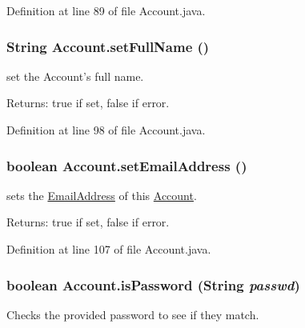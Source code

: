 Definition at line 89 of file Account.java.\hypertarget{classAccount_b24ee6fdfa6029cba65b217050933c89}{
\subsubsection{\setlength{\rightskip}{0pt plus 5cm}String Account.setFullName ()}}
\label{classAccount_b24ee6fdfa6029cba65b217050933c89}


set the Account's full name. 

\begin{Desc}
\item[Returns:]true if set, false if error. \end{Desc}


Definition at line 98 of file Account.java.\hypertarget{classAccount_0286b42456e5fe6368467048dc020315}{
\subsubsection{\setlength{\rightskip}{0pt plus 5cm}boolean Account.setEmailAddress ()}}
\label{classAccount_0286b42456e5fe6368467048dc020315}


sets the \hyperlink{classEmailAddress}{EmailAddress} of this \hyperlink{classAccount}{Account}. 

\begin{Desc}
\item[Returns:]true if set, false if error. \end{Desc}


Definition at line 107 of file Account.java.\hypertarget{classAccount_49681dc24e580eee8030061c1ca30614}{
\subsubsection{\setlength{\rightskip}{0pt plus 5cm}boolean Account.isPassword (String {\em passwd})}}
\label{classAccount_49681dc24e580eee8030061c1ca30614}


Checks the provided password to see if they match. 

